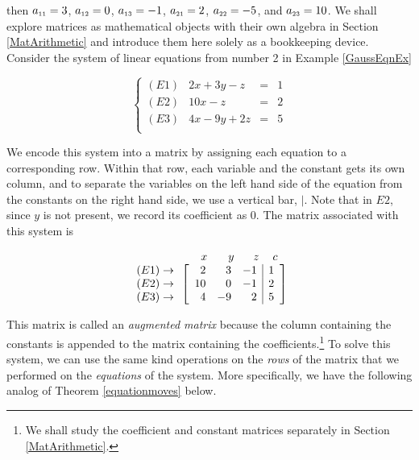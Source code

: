 then $a_{\mbox{\tiny$11$}} = 3$, $a_{\mbox{\tiny$12$}} = 0$, $a_{\mbox{\tiny$13$}} = -1$, $a_{\mbox{\tiny$21$}} = 2$, $a_{\mbox{\tiny$22$}} = -5$, and $a_{\mbox{\tiny$23$}} = 10$.  We shall explore matrices as mathematical objects with their own algebra in Section \ref{MatArithmetic} and introduce them here solely as a bookkeeping device.  Consider the system of linear equations  from number 2 in Example \ref{GaussEqnEx}

\[\left\{ \begin{array}{lrcr} (E1) & 2x+3y-z & = & 1 \\ 
(E2) & 10x-z & = & 2 \\ 
(E3) & 4x-9y+2z & = & 5 \\ \end{array} \right.\]  

We encode this system into a matrix by assigning each equation to a corresponding row.  Within that row, each variable and the constant gets its own column, and to separate the variables on the left hand side of the equation from the constants on the right hand side, we use a vertical bar, $|$.  Note that in $E2$, since $y$ is not present, we record its coefficient as $0$. The matrix associated with this system is 

\[ \begin{array}{c} \begin{array}{rrrrrrr} & & & \hspace{.33in} x & \hspace{.12in} y & \hspace{.1in} z & \hspace{.03in} c \\ \end{array} \\  \begin{array}{r} (E1) \rightarrow \\ (E2) \rightarrow \\ (E3) \rightarrow \end{array}  \left[ \begin{array}{rrr|r} 2 & 3 & -1 & 1\\ 10 & 0 & -1 & 2 \\ 4 & -9 & 2 & 5 \end{array} \right] \end{array} \]  

This matrix is called an \textit{augmented matrix} because the column containing the constants is appended to the matrix containing the coefficients.\footnote{We shall study the coefficient and constant matrices separately in Section \ref{MatArithmetic}.}  To solve this system, we can use the same kind operations on the \textit{rows} of the matrix that we performed on the \textit{equations} of the system. More specifically, we have the following analog of Theorem \ref{equationmoves} below.

